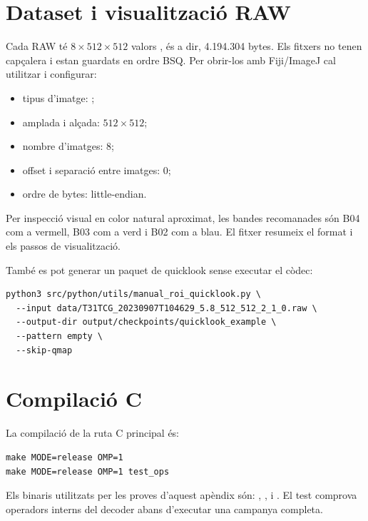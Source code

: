 \section{Dataset i visualització RAW}

Cada RAW té $8\times512\times512$ valors , és a dir,
4.194.304 bytes. Els fitxers no tenen capçalera i estan guardats en ordre BSQ.
Per obrir-los amb Fiji/ImageJ cal utilitzar  i
configurar:

\begin{itemize}[leftmargin=*]
  \item tipus d'imatge: ;
  \item amplada i alçada: $512\times512$;
  \item nombre d'imatges: 8;
  \item offset i separació entre imatges: 0;
  \item ordre de bytes: little-endian.
\end{itemize}

Per inspecció visual en color natural aproximat, les bandes recomanades són B04
com a vermell, B03 com a verd i B02 com a blau. El fitxer 
resumeix el format i els passos de visualització.

També es pot generar un paquet de quicklook sense executar el còdec:

\begin{verbatim}
python3 src/python/utils/manual_roi_quicklook.py \
  --input data/T31TCG_20230907T104629_5.8_512_512_2_1_0.raw \
  --output-dir output/checkpoints/quicklook_example \
  --pattern empty \
  --skip-qmap
\end{verbatim}

\section{Compilació C}

La compilació de la ruta C principal és:

\begin{verbatim}
make MODE=release OMP=1
make MODE=release OMP=1 test_ops
\end{verbatim}

Els binaris utilitzats per les proves d'aquest apèndix són:
\code{sorteny\_compressor}, ,
 i . El test
 comprova operadors interns del decoder abans d'executar una
campanya completa.

